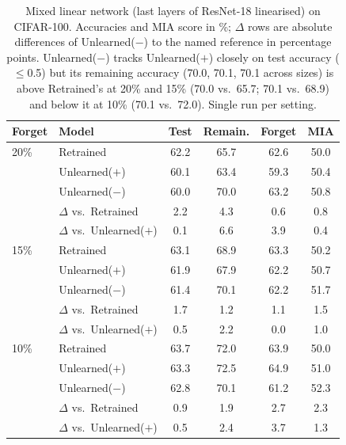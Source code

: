 \begin{table}[t]
  \centering
  \small
  \setlength{\tabcolsep}{4pt}
  \begin{tabular}{@{}llcccc@{}}
    \toprule
    Forget & Model & Test & Remain. & Forget & MIA \\
    \midrule
    20\% & Retrained & 62.2 & 65.7 & 62.6 & 50.0 \\
     & Unlearned($+$) & 60.1 & 63.4 & 59.3 & 50.4 \\
     & Unlearned($-$) & 60.0 & 70.0 & 63.2 & 50.8 \\
     & $\Delta$ vs.\ Retrained & 2.2 & 4.3 & 0.6 & 0.8 \\
     & $\Delta$ vs.\ Unlearned($+$) & 0.1 & 6.6 & 3.9 & 0.4 \\
    \midrule
    15\% & Retrained & 63.1 & 68.9 & 63.3 & 50.2 \\
     & Unlearned($+$) & 61.9 & 67.9 & 62.2 & 50.7 \\
     & Unlearned($-$) & 61.4 & 70.1 & 62.2 & 51.7 \\
     & $\Delta$ vs.\ Retrained & 1.7 & 1.2 & 1.1 & 1.5 \\
     & $\Delta$ vs.\ Unlearned($+$) & 0.5 & 2.2 & 0.0 & 1.0 \\
    \midrule
    10\% & Retrained & 63.7 & 72.0 & 63.9 & 50.0 \\
     & Unlearned($+$) & 63.3 & 72.5 & 64.9 & 51.0 \\
     & Unlearned($-$) & 62.8 & 70.1 & 61.2 & 52.3 \\
     & $\Delta$ vs.\ Retrained & 0.9 & 1.9 & 2.7 & 2.3 \\
     & $\Delta$ vs.\ Unlearned($+$) & 0.5 & 2.4 & 3.7 & 1.3 \\
    \bottomrule
  \end{tabular}
  \caption{Mixed linear network (last layers of ResNet-18 linearised) on CIFAR-100. Accuracies and MIA score in \%; $\Delta$ rows are absolute differences of Unlearned($-$) to the named reference in percentage points. Unlearned($-$) tracks Unlearned($+$) closely on test accuracy ($\le$0.5) but its remaining accuracy (70.0, 70.1, 70.1 across sizes) is above Retrained's at 20\% and 15\% (70.0 vs.\ 65.7; 70.1 vs.\ 68.9) and below it at 10\% (70.1 vs.\ 72.0). Single run per setting.}
  \label{tab:mixed}
\end{table}
